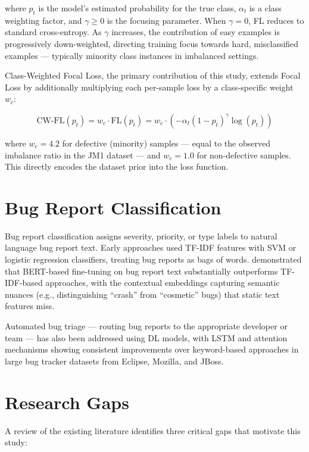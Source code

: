 \documentclass[12pt,a4paper,oneside]{report}
\begin{document}
where $p_t$ is the model's estimated probability for the true class, $\alpha_t$ is a class weighting factor, and $\gamma \geq 0$ is the focusing parameter. When $\gamma = 0$, FL reduces to standard cross-entropy. As $\gamma$ increases, the contribution of easy examples is progressively down-weighted, directing training focus towards hard, misclassified examples --- typically minority class instances in imbalanced settings.

Class-Weighted Focal Loss, the primary contribution of this study, extends Focal Loss by additionally multiplying each per-sample loss by a class-specific weight $w_c$:

\begin{equation}
  \text{CW-FL}(p_t) = w_c \cdot \text{FL}(p_t) = w_c \cdot (-\alpha_t (1 - p_t)^{\gamma} \log(p_t))
  \label{eq:cwfl}
\end{equation}

where $w_c = 4.2$ for defective (minority) samples --- equal to the observed imbalance ratio in the JM1 dataset --- and $w_c = 1.0$ for non-defective samples. This directly encodes the dataset prior into the loss function.

\section{Bug Report Classification}

Bug report classification assigns severity, priority, or type labels to natural language bug report text. Early approaches used TF-IDF features with SVM or logistic regression classifiers, treating bug reports as bags of words. \citet{chen2022} demonstrated that BERT-based fine-tuning on bug report text substantially outperforms TF-IDF-based approaches, with the contextual embeddings capturing semantic nuances (e.g., distinguishing ``crash'' from ``cosmetic'' bugs) that static text features miss.

Automated bug triage --- routing bug reports to the appropriate developer or team --- has also been addressed using DL models, with LSTM and attention mechanisms showing consistent improvements over keyword-based approaches in large bug tracker datasets from Eclipse, Mozilla, and JBoss.

\section{Research Gaps}

A review of the existing literature identifies three critical gaps that motivate this study:
\end{document}
